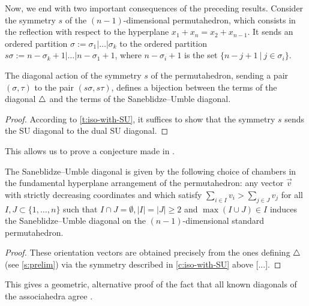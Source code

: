 Now, we end with two important consequences of the preceding results. 
Consider the symmetry $s$ of the $(n-1)$-dimensional permutahedron, which consists in the reflection with respect to the hyperplane $x_1 + x_n = x_2 + x_{n-1}$. 
It sends an ordered partition $\sigma:=\sigma_1 | \ldots | \sigma_k$ to the ordered partition $s\sigma:=n-\sigma_{k}+1 | \ldots | n-\sigma_{1}+1$, where $n-\sigma_i+1$ is the set $\{n-j+1 \ | \ j \in \sigma_i\}$. 

\begin{corollary}
\label{c:iso-with-SU}
The diagonal action of the symmetry $s$ of the permutahedron, sending a pair $(\sigma,\tau)$ to the pair $(s\sigma,s\tau)$, defines a bijection between the terms of the diagonal $\triangle$ and the terms of the Saneblidze--Umble diagonal.
\end{corollary}

\begin{proof}
According to \cref{t:iso-with-SU}, it suffices to show that the symmetry $s$ sends the SU diagonal to the dual SU diagonal. 
\end{proof}

This allows us to prove a conjecture made in \cite[Remark 3.19]{LA21}.

\begin{corollary}
    The Saneblidze--Umble diagonal is given by the following choice of chambers in the fundamental hyperplane arrangement of the permutahedron: any vector $\vec v$ with strictly decreasing coordinates and which satisfy $\sum_{i \in I} v_i > \sum_{j \in J} v_j$ for all $I,J \subset \{1, \ldots, n\}$ such that $I \cap J = \emptyset, |I|=|J| \geq 2$ and $\max(I \cup J) \in I$ induces the Saneblidze--Umble diagonal on the $(n-1)$-dimensional standard permutahedron. 
\end{corollary}

\begin{proof}
    These orientation vectors are obtained precisely from the ones defining $\triangle$ (see \cref{s:prelim}) via the symmetry described in \cref{c:iso-with-SU} above [...]. 
\end{proof}

This gives a geometric, alternative proof of the fact that all known diagonals of the associahedra agree \cite{saneblidzeComparingDiagonalsAssociahedra2022}.



